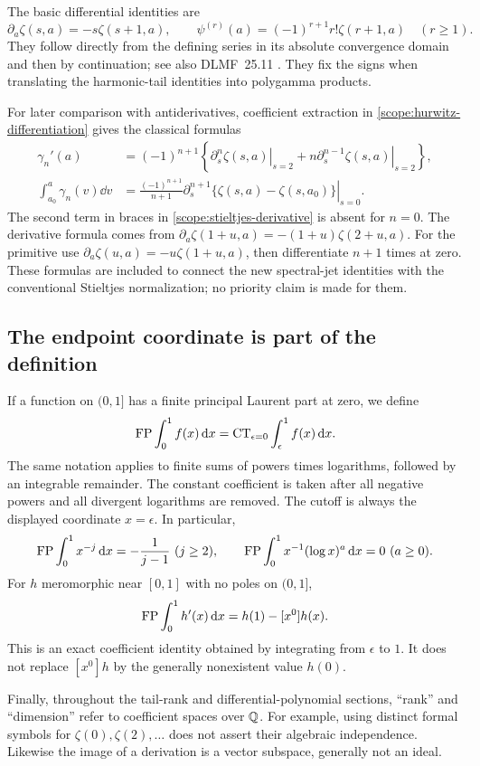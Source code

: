 The basic differential identities are
\begin{equation}\label{scope:hurwitz-differentiation}
 \partial_a\zeta(s,a)=-s\zeta(s+1,a),\qquad
 \psi^{(r)}(a)=(-1)^{r+1}r!\zeta(r+1,a)\quad(r\ge1).
\end{equation}
They follow directly from the defining series in its absolute
convergence domain and then by continuation; see also DLMF~25.11
\cite{DLMF}.  They fix the signs when translating the harmonic-tail
identities into polygamma products.

For later comparison with antiderivatives, coefficient extraction in
\eqref{scope:hurwitz-differentiation} gives the classical formulas
\begin{align}
 \gamma_n'(a)
  &=(-1)^{n+1}
     \left\{\left.\partial_s^n\zeta(s,a)\right|_{s=2}
      +n\left.\partial_s^{n-1}\zeta(s,a)\right|_{s=2}\right\},
       \label{scope:stieltjes-derivative}\\
 \int_{a_0}^{a}\gamma_n(v)\dd v
  &=\frac{(-1)^{n+1}}{n+1}
    \left.\partial_s^{n+1}
       \{\zeta(s,a)-\zeta(s,a_0)\}\right|_{s=0}.
       \label{scope:stieltjes-primitive}
\end{align}
The second term in braces in \eqref{scope:stieltjes-derivative} is
absent for $n=0$.  The derivative formula comes from
$\partial_a\zeta(1+u,a)=-(1+u)\zeta(2+u,a)$.
For the primitive use
$\partial_a\zeta(u,a)=-u\zeta(1+u,a)$, then differentiate
$n+1$ times at zero.  These formulas are included to connect the new
spectral-jet identities with the conventional Stieltjes normalization;
no priority claim is made for them.

\subsection{The endpoint coordinate is part of the definition}

If a function on $(0,1]$ has a finite principal Laurent part at zero,
we define
\begin{equation}\label{scope:finitepart}
 \operatorname{FP}\int_0^1 f(x)\,\mathrm d x
   =\operatorname{CT}_{\epsilon=0}\int_\epsilon^1 f(x)\,\mathrm d x.
\end{equation}
The same notation applies to finite sums of powers times logarithms,
followed by an integrable remainder.  The constant coefficient is taken
after all negative powers and all divergent logarithms are removed.
The cutoff is always the displayed coordinate $x=\epsilon$.
In particular,
\[
 \operatorname{FP}\int_0^1x^{-j}\,\mathrm d x=-\frac1{j-1}\ (j\ge2),\qquad
 \operatorname{FP}\int_0^1x^{-1}(\log x)^a\,\mathrm d x=0\ (a\ge0).
\]
For $h$ meromorphic near $[0,1]$ with no poles on $(0,1]$,
\begin{equation}\label{scope:boundary}
 \operatorname{FP}\int_0^1h'(x)\,\mathrm d x=h(1)-[x^0]h(x).
\end{equation}
This is an exact coefficient identity obtained by integrating from
$\epsilon$ to $1$.  It does not replace $[x^0]h$ by the generally
nonexistent value $h(0)$.

Finally, throughout the tail-rank and differential-polynomial sections,
``rank'' and ``dimension'' refer to coefficient spaces over $\mathbb Q$.
For example, using distinct formal symbols for $\zeta(0),\zeta(2),\ldots$
does not assert their algebraic independence.  Likewise the image of a
derivation is a vector subspace, generally not an ideal.
